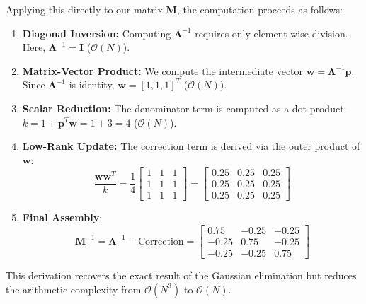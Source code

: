 \documentclass[a4paper,11pt]{article}
\begin{document}
Applying this directly to our matrix $\mathbf{M}$, the computation proceeds as follows:

\begin{enumerate}
    \item \textbf{Diagonal Inversion:} Computing $\mathbf{\Lambda}^{-1}$ requires only element-wise division. Here, $\mathbf{\Lambda}^{-1} = \mathbf{I}$ ($\mathcal{O}(N)$).
    
    \item \textbf{Matrix-Vector Product:} We compute the intermediate vector $\mathbf{w} = \mathbf{\Lambda}^{-1}\mathbf{p}$. Since $\mathbf{\Lambda}^{-1}$ is identity, $\mathbf{w} = [1, 1, 1]^T$ ($\mathcal{O}(N)$).
    
    \item \textbf{Scalar Reduction:} The denominator term is computed as a dot product: $k = 1 + \mathbf{p}^T\mathbf{w} = 1 + 3 = 4$ ($\mathcal{O}(N)$).
    
    \item \textbf{Low-Rank Update:} The correction term is derived via the outer product of $\mathbf{w}$:
    \begin{equation}
        \frac{\mathbf{w}\mathbf{w}^T}{k} = \frac{1}{4}\begin{bmatrix}
        1 & 1 & 1 \\
        1 & 1 & 1 \\
        1 & 1 & 1
        \end{bmatrix} = \begin{bmatrix}
        0.25 & 0.25 & 0.25 \\
        0.25 & 0.25 & 0.25 \\
        0.25 & 0.25 & 0.25
        \end{bmatrix}
    \end{equation}
    
    \item \textbf{Final Assembly}:
    \begin{equation}
        \mathbf{M}^{-1} = \mathbf{\Lambda}^{-1} - \text{Correction} = \begin{bmatrix}
        0.75 & -0.25 & -0.25 \\
        -0.25 & 0.75 & -0.25 \\
        -0.25 & -0.25 & 0.75
        \end{bmatrix}
    \end{equation}
\end{enumerate}

This derivation recovers the exact result of the Gaussian elimination but reduces the arithmetic complexity from $\mathcal{O}(N^3)$ to $\mathcal{O}(N)$.
\end{document}

